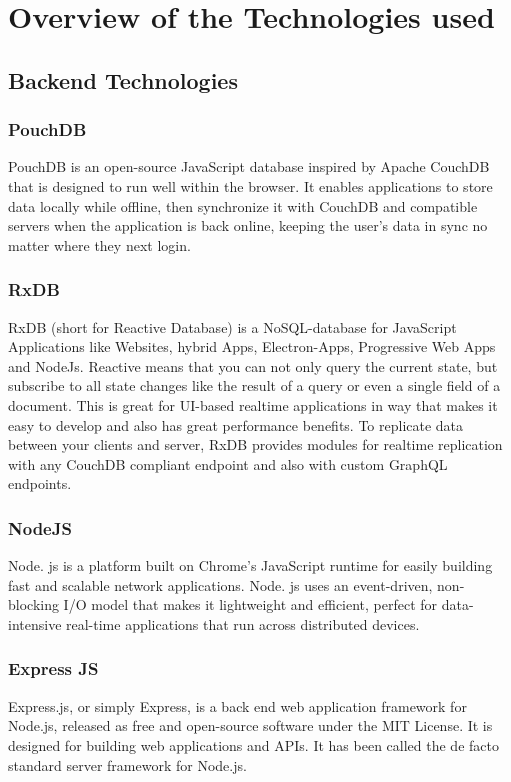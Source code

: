 \section{Overview of the Technologies used}

\subsection{Backend Technologies}

    \subsubsection{PouchDB}
    PouchDB is an open-source JavaScript database inspired by Apache CouchDB 
    that is designed to run well within the browser.
    It enables applications to store data locally while offline, 
    then synchronize it with CouchDB and compatible servers when the application is back online, keeping the user's data in sync 
    no matter where they next login.

    \subsubsection{RxDB}
    RxDB (short for Reactive Database) is a NoSQL-database for JavaScript Applications like Websites, 
    hybrid Apps, Electron-Apps, Progressive Web Apps and NodeJs. Reactive means that you can not only 
    query the current state, but subscribe to all state changes like the result of a query or even a 
    single field of a document. This is great for UI-based realtime applications in way that makes it 
    easy to develop and also has great performance benefits. To replicate data between your clients and server,
    RxDB provides modules for realtime replication with any CouchDB compliant endpoint and also with custom GraphQL endpoints. 

    \subsubsection{NodeJS}
    Node. js is a platform built on Chrome's JavaScript runtime for easily building fast and scalable network applications. 
    Node. js uses an event-driven, non-blocking I/O model that makes it lightweight and efficient, perfect for data-intensive 
    real-time applications that run across distributed devices.

    \subsubsection{Express JS}
    Express.js, or simply Express, is a back end web application framework for Node.js, released as free and open-source software under the MIT License. 
    It is designed for building web applications and APIs.
    It has been called the de facto standard server framework for Node.js.

